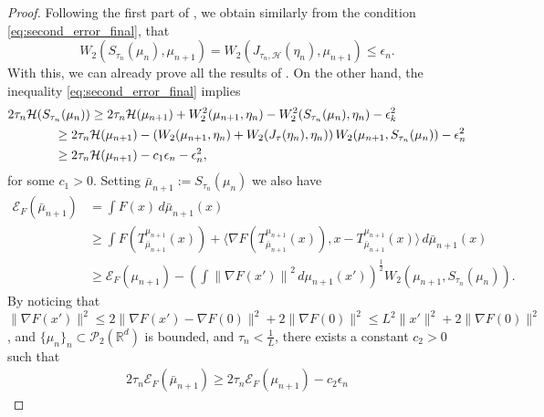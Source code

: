 \documentclass[11pt]{article}
\newcommand{\cP}{\mathcal{P}}
\newcommand{\cT}{S}
\newcommand{\R}{\mathbb{R}}
\numberwithin{equation}{section}
\begin{document}
\begin{proof}
	Following the first part of , we obtain similarly from the condition \eqref{eq:second_error_final}, that
	\[W_2(\cT_{\tau_n}(\mu_n),\mu_{n+1})=W_2(J_{\tau_n,\mathcal{H}}(\eta_n),\mu_{n+1})\leq \epsilon_n.\]
	With this, we can already prove all the results of . On the other hand, the inequality \eqref{eq:second_error_final} implies \begin{equation*}
		\begin{aligned}
			2\tau_n\mathcal{H}(\cT_{\tau_n}(\mu_{n})) & \geq 2\tau_n\mathcal{H}(\mu_{n+1})+W_2^2(\mu_{n+1},\eta_{n})- W_2^2(\cT_{\tau_n}(\mu_{n}),\eta_{n})- \epsilon_k^2\\
			& \hspace{-1cm}\geq 2\tau_n\mathcal{H}(\mu_{n+1})-\left(W_2(\mu_{n+1},\eta_{n})+ W_2(J_{\tau}(\eta_{n}),\eta_{n})\right)W_2(\mu_{n+1},\cT_{\tau_n}(\mu_n)) - \epsilon_n^2 \\
			& \hspace{-1cm}\geq 2\tau_n\mathcal{H}(\mu_{n+1})-c_1\epsilon_n - \epsilon_n^2,
		\end{aligned}
	\end{equation*}
	for some $c_1>0$. Setting $\bar \mu_{n+1}:=\cT_{\tau_n}(\mu_{n})$ we also have 
	\begin{equation*}
		\begin{aligned}
			\mathcal{E}_F(\bar \mu_{n+1}) & = \int F(x) \, d\bar \mu_{n+1}(x) \\ 
			&\geq \int F\left(T_{\bar \mu_{n+1}}^{\mu_{n+1}}(x)\right) +\langle \nabla F\left(T_{\bar \mu_{n+1}}^{\mu_{n+1}}(x)\right),x-T_{\bar \mu_{n+1}}^{\mu_{n+1}}(x)  \rangle \, d\bar \mu_{n+1}(x)\\
			&	\geq \mathcal{E}_F(\mu_{n+1}) - \left(\int \left\|\nabla F(x')\right\|^2\, d \mu_{n+1}(x')\right)^{\frac{1}{2}} W_2(\mu_{n+1},\cT_{\tau_n}(\mu_n)).
		\end{aligned}
	\end{equation*}
	By noticing that $\|\nabla F(x')\|^2 \leq 2\|\nabla F(x')-\nabla F(0)\|^2+2\|\nabla F(0)\|^2 \leq L^2 \|x'\|^2 + 2\|\nabla F(0)\|^2$, and $\{\mu_n\}_n\subset \cP_2(\R^d)$ is bounded, and $\tau_n < \frac{1}{L}$, there exists a constant $c_2>0$ such that
	\begin{equation*}
		\begin{aligned}
			2\tau_n\mathcal{E}_F(\bar \mu_{n+1})	\geq 2\tau_n\mathcal{E}_F(\mu_{n+1}) - c_2 \epsilon_n
		\end{aligned}
	\end{equation*}

\end{proof}
\end{document}
